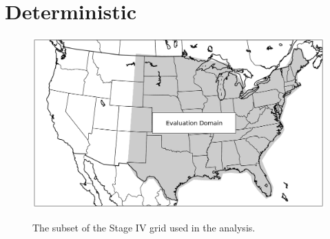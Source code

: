 

\chapter{Deterministic}
\label{deterministic}









\clearpage
\begin{figure}[cc]
    \centering
    \includegraphics[width=\textwidth,height=\textheight,keepaspectratio]{
    ./deterministic/figs/domain}\\
    \caption{The subset of the Stage IV grid used in the analysis.}
    \label{domain}
\end{figure}


